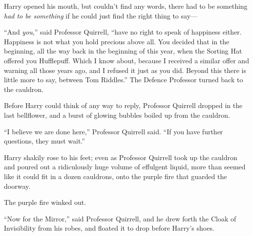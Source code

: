 Harry opened his mouth, but couldn’t find any words, there had to be something \emph{had to be something} if he could just find the right thing to say—

“And \emph{you},” said Professor Quirrell, “have no right to speak of happiness either. Happiness is not what you hold precious above all. You decided that in the beginning, all the way back in the beginning of this year, when the Sorting Hat offered you Hufflepuff. Which I know about, because I received a similar offer and warning all those years ago, and I refused it just as you did. Beyond this there is little more to say, between Tom Riddles.” The Defence Professor turned back to the cauldron.

Before Harry could think of any way to reply, Professor Quirrell dropped in the last bellflower, and a burst of glowing bubbles boiled up from the cauldron.

“I believe we are done here,” Professor Quirrell said. “If you have further questions, they must wait.”

Harry shakily rose to his feet; even as Professor Quirrell took up the cauldron and poured out a ridiculously huge volume of effulgent liquid, more than seemed like it could fit in a dozen cauldrons, onto the purple fire that guarded the doorway.

The purple fire winked out.

“Now for the Mirror,” said Professor Quirrell, and he drew forth the Cloak of Invisibility from his robes, and floated it to drop before Harry’s shoes.

